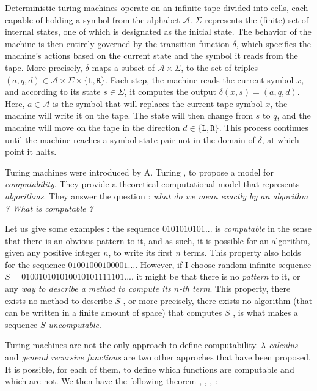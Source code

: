 Deterministic turing machines operate on an infinite tape divided into cells, each capable of holding a symbol from the alphabet $ \mathcal A $. $ \Sigma $ represents the (finite) set of internal states, one of which is designated as the initial state. The behavior of the machine is then entirely governed by the transition function $ \delta $, which specifies the machine's actions based on the current state and the symbol it reads from the tape. More precisely, $ \delta $ maps a subset of $ \mathcal A \times \Sigma $, to the set of triples $ (a, q, d) \in \mathcal A \times \Sigma \times \{ \texttt L, \texttt R \} $. Each step, the machine reads the current symbol $ x $, and according to its state $ s \in \Sigma $, it computes the output $ \delta(x,s) = (a, q, d) $. Here, $ a \in \mathcal A $ is the symbol that will replaces the current tape symbol $ x $, the machine will write it on the tape. The state will then change from $ s $ to $ q $, and the machine will move on the tape in the direction $ d \in \{ \texttt L, \texttt R\} $. This process continues until the machine reaches a symbol-state pair not in the domain of $ \delta $, at which point it halts.

Turing machines were introduced by A. Turing \cite{turing1936}, \cite{turing1992} to propose a model for \textit{computability}. They provide a theoretical computational model that represents \textit{algorithms}. They answer the question : \textit{what do we mean exactly by an algorithm ? What is computable ?} 

Let us give some examples : the sequence $ 0101010101... $ is \textit{computable} in the sense that there is an obvious pattern to it, and as such, it is possible for an algorithm, given any positive integer $ n $, to write its first $ n $ terms. This property also holds for the sequence $ 01001000100001 \dots $. However, if I choose \og random \fg infinite sequence $ S = 010010101010010101111101... $, it might be that there is no \textit{pattern} to it, or any \textit{way to describe a method to compute its $ n $-th term}. This property, \og there exists no method to describe $ S $ \fg, or more precisely, \og there exists no algorithm (that can be written in a finite amount of space) that computes $ S $ \fg, is what makes a sequence $ S $ \textit{uncomputable}.

Turing machines are not the only approach to define computability. \textit{$ \lambda $-calculus} and \textit{general recursive functions} are two other approches that have been proposed. It is possible, for each of them, to define which functions are computable and which are not. We then have the following theorem \cite{soare1996}, \cite{church1936}, \cite{kleene1936}, \cite{turing1937} :

